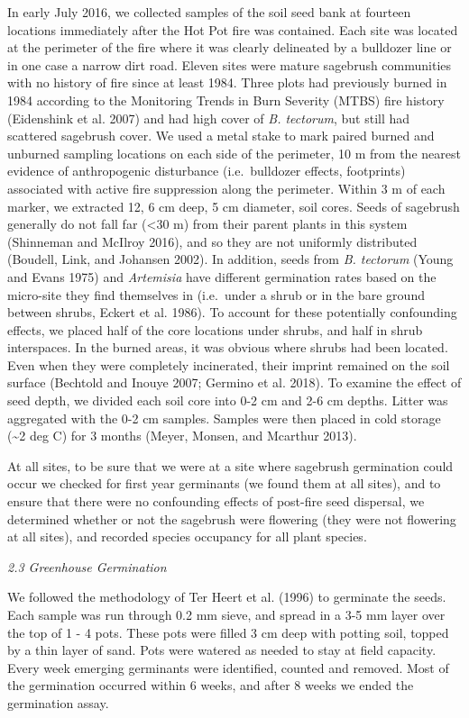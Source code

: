 \documentclass[
  12pt,
]{article}
\begin{document}
In early July 2016, we collected samples of the soil seed bank at
fourteen locations immediately after the Hot Pot fire was contained.
Each site was located at the perimeter of the fire where it was clearly
delineated by a bulldozer line or in one case a narrow dirt road. Eleven
sites were mature sagebrush communities with no history of fire since at
least 1984. Three plots had previously burned in 1984 according to the
Monitoring Trends in Burn Severity (MTBS) fire history (Eidenshink et
al. 2007) and had high cover of \emph{B. tectorum}, but still had
scattered sagebrush cover. We used a metal stake to mark paired burned
and unburned sampling locations on each side of the perimeter, 10 m from
the nearest evidence of anthropogenic disturbance (i.e.~bulldozer
effects, footprints) associated with active fire suppression along the
perimeter. Within 3 m of each marker, we extracted 12, 6 cm deep, 5 cm
diameter, soil cores. Seeds of sagebrush generally do not fall far
(\textless30 m) from their parent plants in this system (Shinneman and
McIlroy 2016), and so they are not uniformly distributed (Boudell, Link,
and Johansen 2002). In addition, seeds from \emph{B. tectorum} (Young
and Evans 1975) and \emph{Artemisia} have different germination rates
based on the micro-site they find themselves in (i.e.~under a shrub or
in the bare ground between shrubs, Eckert et al. 1986). To account for
these potentially confounding effects, we placed half of the core
locations under shrubs, and half in shrub interspaces. In the burned
areas, it was obvious where shrubs had been located. Even when they were
completely incinerated, their imprint remained on the soil surface
(Bechtold and Inouye 2007; Germino et al. 2018). To examine the effect
of seed depth, we divided each soil core into 0-2 cm and 2-6 cm depths.
Litter was aggregated with the 0-2 cm samples. Samples were then placed
in cold storage (\textasciitilde2 deg C) for 3 months (Meyer, Monsen,
and Mcarthur 2013).

At all sites, to be sure that we were at a site where sagebrush
germination could occur we checked for first year germinants (we found
them at all sites), and to ensure that there were no confounding effects
of post-fire seed dispersal, we determined whether or not the sagebrush
were flowering (they were not flowering at all sites), and recorded
species occupancy for all plant species.

\emph{2.3 Greenhouse Germination}

We followed the methodology of Ter Heert et al. (1996) to germinate the
seeds. Each sample was run through 0.2 mm sieve, and spread in a 3-5 mm
layer over the top of 1 - 4 pots. These pots were filled 3 cm deep with
potting soil, topped by a thin layer of sand. Pots were watered as
needed to stay at field capacity. Every week emerging germinants were
identified, counted and removed. Most of the germination occurred within
6 weeks, and after 8 weeks we ended the germination assay.
\end{document}
